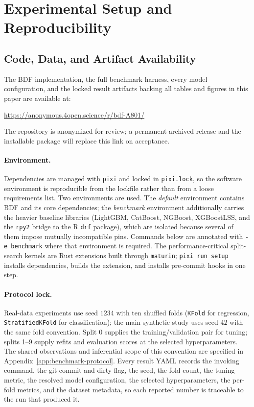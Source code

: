 \section{Experimental Setup and Reproducibility}\label{app:experimental-setup}

\subsection{Code, Data, and Artifact Availability}\label{app:code-availability}

The BDF implementation, the full benchmark harness, every model configuration, and the locked result artifacts backing all tables and figures in this paper are available at:

\begin{center}
\url{https://anonymous.4open.science/r/bdf-A801/}
\end{center}

\noindent The repository is anonymized for review; a permanent archived release and the installable package will replace this link on acceptance.

\paragraph{Environment.}
Dependencies are managed with \texttt{pixi} and locked in \texttt{pixi.lock}, so the software environment is reproducible from the lockfile rather than from a loose requirements list. Two environments are used. The \emph{default} environment contains BDF and its core dependencies; the \emph{benchmark} environment additionally carries the heavier baseline libraries (LightGBM, CatBoost, NGBoost, XGBoostLSS, and the \texttt{rpy2} bridge to the R \texttt{drf} package), which are isolated because several of them impose mutually incompatible pins. Commands below are annotated with \texttt{-e benchmark} where that environment is required. The performance-critical split-search kernels are Rust extensions built through \texttt{maturin}; \texttt{pixi run setup} installs dependencies, builds the extension, and installs pre-commit hooks in one step.

\paragraph{Protocol lock.}
Real-data experiments use seed $1234$ with ten shuffled folds (\texttt{KFold} for regression, \texttt{StratifiedKFold} for classification); the main synthetic study uses seed $42$ with the same fold convention. Split 0 supplies the training/validation pair for tuning; splits 1--9 supply refits and evaluation scores at the selected hyperparameters. The shared observations and inferential scope of this convention are specified in Appendix~\ref{app:benchmark-protocol}. Every result YAML records the invoking command, the git commit and dirty flag, the seed, the fold count, the tuning metric, the resolved model configuration, the selected hyperparameters, the per-fold metrics, and the dataset metadata, so each reported number is traceable to the run that produced it.

